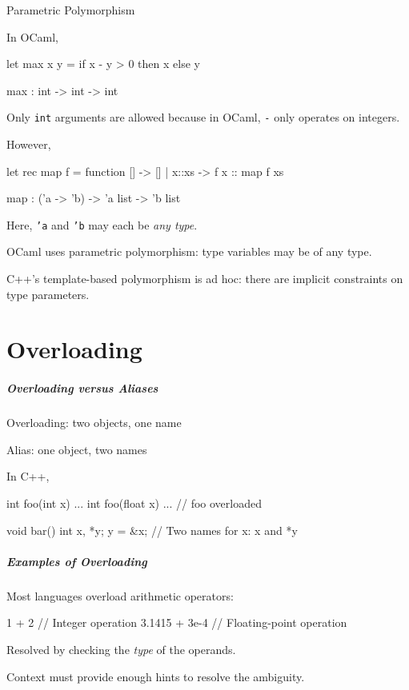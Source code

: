 \documentclass{plt}
\begin{document}
\begin{frame}[fragile]{Parametric Polymorphism}

In OCaml,

\begin{ocaml}
let max x y = if x - y > 0 then x else y

max : int -> int -> int
\end{ocaml}

Only \texttt{int} arguments are allowed because in OCaml, \texttt{-}
only operates on integers.

However,

\begin{ocaml}
let rec map f = function [] -> [] | x::xs -> f x :: map f xs

map : ('a -> 'b) -> 'a list -> 'b list
\end{ocaml}

Here, \texttt{'a} and \texttt{'b} may each be \emph{any type}.

OCaml uses parametric polymorphism: type variables may be of any type.

C++'s template-based polymorphism is ad hoc: there are implicit
constraints on type parameters.

\end{frame}

\part{Overloading}

\begin{frame}[fragile]
  \frametitle{Overloading versus Aliases}

Overloading: two objects, one name

Alias: one object, two names

In C++,

\begin{C++}
int foo(int x) { ... }
int foo(float x) { ... } // foo overloaded

void bar()
{
  int x, *y;
  y = &x;  // Two names for x: x and *y
}
\end{C++}

\end{frame}

\begin{frame}[fragile]
  \frametitle{Examples of Overloading}

Most languages overload arithmetic operators:

\begin{C++}
1 + 2          // Integer operation
3.1415 + 3e-4  // Floating-point operation
\end{C++}


Resolved by checking the \emph{type} of the operands.

Context must provide enough hints to resolve the ambiguity.

\end{frame}
\end{document}
